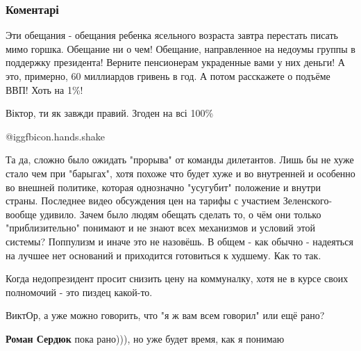  
 
 
 
 
\subsubsection{Коментарі}
\label{sec:02_12_2019.fb.pozumentschikov_viktor.1.nadezhdy.cmt}

\begin{itemize} %

Эти обещания - обещания ребенка ясельного возраста завтра перестать писать мимо
горшка. Обещание ни о чем! Обещание, направленное на недоумы группы в поддержку
президента! Верните пенсионерам украденные вами у них деньги! А это, примерно,
60 миллиардов гривень в год. А потом расскажете о подъёме ВВП! Хоть на 1\%!


Віктор, ти як завжди правий. Згоден на всі 100\%

 @igg{fbicon.hands.shake} 


Та да, сложно было ожидать "прорыва" от команды дилетантов. Лишь бы не хуже
стало чем при "барыгах", хотя похоже что будет хуже и во внутренней и особенно
во внешней политике, которая однозначно "усугубит" положение и внутри страны.
Последнее видео обсуждения цен на тарифы с участием Зеленского- вообще удивило.
Зачем было людям обещать сделать то, о чём они только "приблизительно" понимают
и не знают всех механизмов и условий этой системы? Поппулизм и иначе это не
назовёшь. В общем - как обычно - надеяться на лучшее нет оснований и приходится
готовиться к худшему. Как то так.

Когда недопрезидент просит снизить цену на коммуналку, хотя не в курсе своих полномочий - это пиздец какой-то.

ВиктОр, а уже можно говорить, что "я ж вам всем говорил" или ещё рано?

\begin{itemize} %
\textbf{Роман Сердюк} пока рано))), но уже будет время, как я понимаю


\end{itemize}
\end{itemize}
